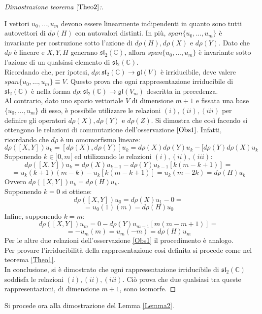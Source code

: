 \documentclass[12pt,a4paper]{report}
\theoremstyle{definition}
\theoremstyle{definition}
\theoremstyle{definition}
\theoremstyle{remark}
\begin{document}
\begin{proof}[Dimostrazione teorema $\ref{Theo2}$:]
\begin{itemize}
	\end{itemize}
I vettori $u_0,...,u_m$ devono essere linearmente indipendenti in quanto sono tutti autovettori di $d\rho(H)$ con autovalori distinti. In più, $span\{u_0,...,u_m\}$ è invariante per costruzione sotto l'azione di $d\rho(H),d\rho(X)$ e $d\rho(Y)$. Dato che $d\rho$ è lineare e $X,Y,H$ generano $\mathfrak{sl_2(\mathbb{C})}$, allora $span\{u_0,...,u_m\}$ è invariante sotto l'azione di un qualsiasi elemento di $\mathfrak{sl_2(\mathbb{C})}$.\\
Ricordando che, per ipotesi, $d\rho:\mathfrak{sl_2(\mathbb{C})}\rightarrow \mathfrak{gl}(V)$ è irriducibile, deve valere\\ $span\{u_0,...,u_m\}\equiv V$. Questo prova che ogni rappresentazione irriducibile di $\mathfrak{sl_2(\mathbb{C})}$ è nella forma $d\rho:\mathfrak{sl_2(\mathbb{C})}\rightarrow \mathfrak{gl}(V_m)$ descritta in precedenza.\\
Al contrario, dato uno spazio vettoriale $V$ di dimensione $m+1$ e fissata una base $\{u_0,...,u_m\}$ di esso, è possibile utilizzare le relazioni $(i),(ii),(iii)$ per definire gli operatori $d\rho(X),d\rho(Y)$ e $d\rho(Z)$. Si dimostra che così facendo si ottengono le relazioni di commutazione dell'osservazione $\ref{Obs1}$. Infatti, ricordando che $d\rho$ è un omomorfismo lineare:
$$d\rho([X,Y])u_k=[d\rho(X),d\rho(Y)]u_k=d\rho(X)d\rho(Y)u_k-[d\rho(Y)d\rho(X)u_k$$
Supponendo $k\in ]0,m[$ ed utilizzando le relazioni $(i),(ii),(iii)$:
$$d\rho([X,Y])u_k=d\rho(X)u_{k+1}-d\rho(Y)u_{k-1}[k(m-k+1)]=$$
$$=u_k(k+1)(m-k)-u_k[k(m-k+1)]=u_k(m-2k)=d\rho(H)u_k$$
Ovvero $d\rho([X,Y])u_k=d\rho(H)u_k$.\\
Supponendo $k=0$ si ottiene: $$d\rho([X,Y])u_0=d\rho(X)u_{1}-0=$$
$$=u_0(1)(m)=d\rho(H)u_0$$
Infine, supponendo $k=m$:
$$d\rho([X,Y])u_m=0-d\rho(Y)u_{m-1}[m(m-m+1)]=$$
$$=-u_m(m)=u_m(-m)=d\rho(H)u_m$$
Per le altre due relazioni dell'osservazione \ref{Obs1} il procedimento è analogo.\\
Per provare l'irriducibilità della rappresentazione così definita si procede come nel teorema \ref{Theo1}.\\
In conclusione, si è dimostrato che ogni rappresentazione irriducibile di $\mathfrak{sl_2(\mathbb{C})}$ soddisfa le relazioni $(i),(ii),(iii)$. Ciò prova che due qualsiasi tra queste rappresentazioni, di dimensione $m+1$, sono isomorfe.
\end{proof}
Si procede ora alla dimostrazione del Lemma \ref{Lemma2}.
\end{document}
